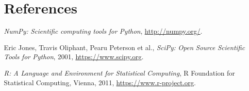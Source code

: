 \documentclass[fontsize=10pt,paper=letter,BCOR=-6mm,DIV=8]{scrartcl}
\begin{document}
\section{References}
\begin{trivlist}
\item
\textit{NumPy: Scientific computing tools for Python}, \url{http://numpy.org/}.

\item
Eric Jones, Travis Oliphant, Pearu Peterson et al., \textit{SciPy: Open Source Scientific Tools for Python}, 2001, \url{https://www.scipy.org}.

\item
\textit{R: A Language and Environment for Statistical Computing}, R Foundation for Statistical Computing, Vienna, 2011, \url{https://www.r-project.org}.
\end{trivlist}
\end{document}

